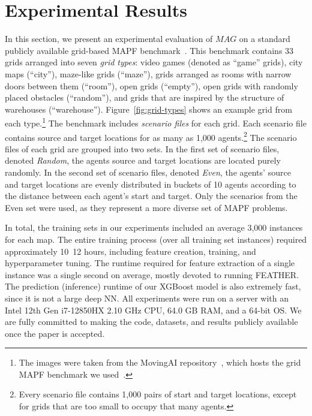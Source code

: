 \documentclass[letterpaper]{article} %
\newcommand{\Carmel}[1]{}
\newcommand{\Roni}[1]{}
\newcommand{\mapfgas}[1]{\ensuremath{\textit{MAG}}\xspace}
\begin{document}
\section{Experimental Results}
\label{scn:EXPERIMENT}



In this section, we present an experimental evaluation of \mapfgas\ on a standard publicly available grid-based MAPF benchmark~\cite{stern2019multi}.
This benchmark contains 33 grids arranged into seven \emph{grid types}: video
games (denoted as ``game'' grids), city maps (``city''), maze-like
grids (``maze''), grids arranged as rooms with narrow doors
between them (``room''), open grids (``empty''), open grids with
randomly placed obstacles (``random''), and grids that are inspired by the structure of warehouses (``warehouse'').
Figure~\ref{fig:grid-types} shows an example grid from each type.\footnote{The images were taken from the MovingAI repository~\cite{sturtevant2012benchmarks}, which hosts the grid MAPF benchmark we used~\cite{stern2019multi}.}
The benchmark includes \emph{scenario files} for each grid.
Each scenario file contains source and target locations for as many as 1,000 agents.\footnote{Every scenario file contains 1,000 pairs of start and target locations, except for grids that are too small to occupy that many agents.} %
The scenario files of each grid are grouped into two sets.
In the first set of scenario files, denoted
\emph{Random},
the agents source and target locations are located
purely randomly.
In the second set of scenario files, denoted
\emph{Even}, the agents’ source and target locations are evenly distributed in buckets of 10 agents according to the distance between each agent's start and target.
Only the scenarios from the Even set were used, as they represent a more diverse set of MAPF problems.


In total, the training sets in our experiments included an average 3,000 instances for each map. The entire training process (over all training set instances) required approximately 10~12 hours, including feature creation, training, and hyperparameter tuning. The runtime required for feature extraction of a single instance was a single second on average, mostly devoted to running FEATHER. The prediction (inference) runtime of our XGBoost model is also extremely fast, since it is not a large deep NN. All experiments were run on a server with an Intel 12th Gen i7-12850HX 2.10 GHz CPU, 64.0 GB RAM, and a 64-bit OS. We are fully committed to making the code, datasets, and results publicly available once the paper is accepted.
\end{document}

